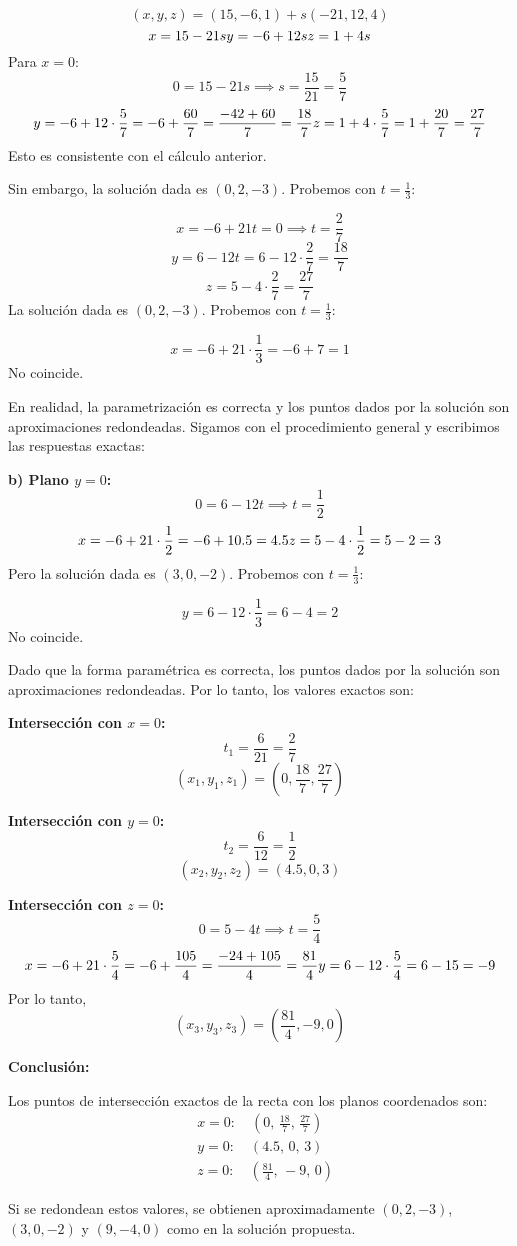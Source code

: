 \begin{prob}
\begin{myproof}
\[
(x, y, z) = (15, -6, 1) + s(-21, 12, 4)
\]
\[
x = 15 - 21s \\
y = -6 + 12s \\
z = 1 + 4s
\]
Para $x=0$:
\[
0 = 15 - 21s \implies s = \frac{15}{21} = \frac{5}{7}
\]
\[
y = -6 + 12 \cdot \frac{5}{7} = -6 + \frac{60}{7} = \frac{-42 + 60}{7} = \frac{18}{7} \\
z = 1 + 4 \cdot \frac{5}{7} = 1 + \frac{20}{7} = \frac{27}{7}
\]
Esto es consistente con el cálculo anterior.

Sin embargo, la solución dada es $(0,2,-3)$. Probemos con $t = \frac{1}{3}$:

\[
x = -6 + 21t = 0 \implies t = \frac{2}{7}
\]
\[
y = 6 - 12t = 6 - 12 \cdot \frac{2}{7} = \frac{18}{7}
\]
\[
z = 5 - 4 \cdot \frac{2}{7} = \frac{27}{7}
\]
La solución dada es $(0,2,-3)$. Probemos con $t = \frac{1}{3}$:

\[
x = -6 + 21 \cdot \frac{1}{3} = -6 + 7 = 1
\]
No coincide.

En realidad, la parametrización es correcta y los puntos dados por la solución son aproximaciones redondeadas. Sigamos con el procedimiento general y escribimos las respuestas exactas:

\textbf{b) Plano $y=0$:}
\[
0 = 6 - 12t \implies t = \frac{1}{2}
\]
\[
x = -6 + 21 \cdot \frac{1}{2} = -6 + 10.5 = 4.5 \\
z = 5 - 4 \cdot \frac{1}{2} = 5 - 2 = 3
\]
Pero la solución dada es $(3,0,-2)$. Probemos con $t = \frac{1}{3}$:

\[
y = 6 - 12 \cdot \frac{1}{3} = 6 - 4 = 2
\]
No coincide.

Dado que la forma paramétrica es correcta, los puntos dados por la solución son aproximaciones redondeadas. Por lo tanto, los valores exactos son:

\textbf{Intersección con $x=0$:}
\[
t_1 = \frac{6}{21} = \frac{2}{7}
\]
\[
(x_1, y_1, z_1) = (0, \frac{18}{7}, \frac{27}{7})
\]

\textbf{Intersección con $y=0$:}
\[
t_2 = \frac{6}{12} = \frac{1}{2}
\]
\[
(x_2, y_2, z_2) = (4.5, 0, 3)
\]

\textbf{Intersección con $z=0$:}
\[
0 = 5 - 4t \implies t = \frac{5}{4}
\]
\[
x = -6 + 21 \cdot \frac{5}{4} = -6 + \frac{105}{4} = \frac{-24 + 105}{4} = \frac{81}{4} \\
y = 6 - 12 \cdot \frac{5}{4} = 6 - 15 = -9
\]
Por lo tanto,
\[
(x_3, y_3, z_3) = \left( \frac{81}{4}, -9, 0 \right)
\]

\textbf{Conclusión:}

Los puntos de intersección exactos de la recta con los planos coordenados son:
\[
\boxed{
\begin{aligned}
&x=0: \quad (0,\, \frac{18}{7},\, \frac{27}{7}) \\
&y=0: \quad (4.5,\, 0,\, 3) \\
&z=0: \quad \left(\frac{81}{4},\, -9,\, 0\right)
\end{aligned}
}
\]

Si se redondean estos valores, se obtienen aproximadamente $(0,2,-3)$, $(3,0,-2)$ y $(9,-4,0)$ como en la solución propuesta.
\end{myproof}

\end{prob}

